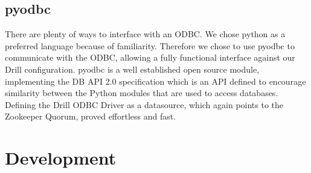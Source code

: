 \documentclass[a4paper,english]{report}
\begin{document}
			\subsection{pyodbc}
				There are plenty of ways to interface with an ODBC. We chose python as a preferred language because of familiarity. Therefore we chose to use pyodbc\cite{pyodbc} to communicate with the ODBC, allowing a fully functional interface against our Drill configuration. pyodbc is a well established open source module, implementing the DB API 2.0 specification which is an API defined to encourage similarity between the Python modules that are used to access databases. Defining the Drill ODBC Driver as a datasource, which again points to the Zookeeper Quorum, proved effortless and fast.
		\section{Development}
\end{document}
